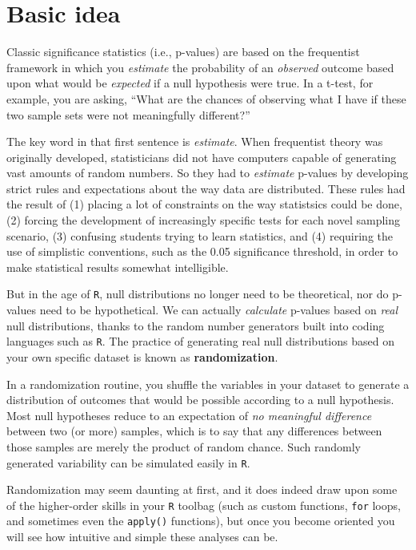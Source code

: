 \documentclass[]{book}
\begin{document}
\hypertarget{basic-idea}{%
\section*{Basic idea}\label{basic-idea}}

Classic significance statistics (i.e., p-values) are based on the frequentist framework in which you \emph{estimate} the probability of an \emph{observed} outcome based upon what would be \emph{expected} if a null hypothesis were true. In a t-test, for example, you are asking, ``What are the chances of observing what I have if these two sample sets were not meaningfully different?''

The key word in that first sentence is \emph{estimate}. When frequentist theory was originally developed, statisticians did not have computers capable of generating vast amounts of random numbers. So they had to \emph{estimate} p-values by developing strict rules and expectations about the way data are distributed. These rules had the result of (1) placing a lot of constraints on the way statistsics could be done, (2) forcing the development of increasingly specific tests for each novel sampling scenario, (3) confusing students trying to learn statistics, and (4) requiring the use of simplistic conventions, such as the 0.05 significance threshold, in order to make statistical results somewhat intelligible.

But in the age of \texttt{R}, null distributions no longer need to be theoretical, nor do p-values need to be hypothetical. We can actually \emph{calculate} p-values based on \emph{real} null distributions, thanks to the random number generators built into coding languages such as \texttt{R}. The practice of generating real null distributions based on your own specific dataset is known as \textbf{randomization}.

In a randomization routine, you shuffle the variables in your dataset to generate a distribution of outcomes that would be possible according to a null hypothesis. Most null hypotheses reduce to an expectation of \emph{no meaningful difference} between two (or more) samples, which is to say that any differences between those samples are merely the product of random chance. Such randomly generated variability can be simulated easily in \texttt{R}.

Randomization may seem daunting at first, and it does indeed draw upon some of the higher-order skills in your \texttt{R} toolbag (such as custom functions, \texttt{for} loops, and sometimes even the \texttt{apply()} functions), but once you become oriented you will see how intuitive and simple these analyses can be.
\end{document}
